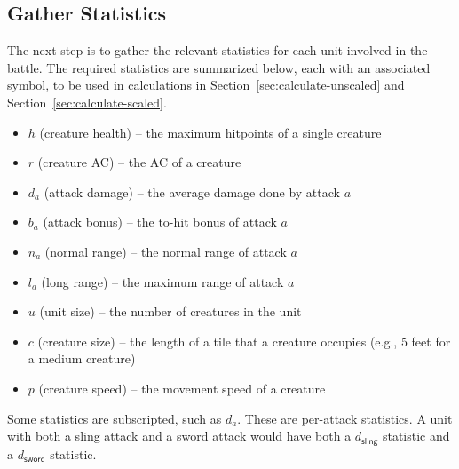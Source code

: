 \subsection{Gather Statistics}

The next step is to gather the relevant statistics
for each unit involved in the battle.
The required statistics are summarized below,
each with an associated symbol,
to be used in calculations in Section~\ref{sec:calculate-unscaled} and Section~\ref{sec:calculate-scaled}.
%
\begin{itemize}
    \item $h$ (creature health) -- the maximum hitpoints of a single creature
    \item $r$ (creature AC) -- the AC of a creature
    \item $d_a$ (attack damage) -- the average damage done by attack $a$
    \item $b_a$ (attack bonus) -- the to-hit bonus of attack $a$
    \item $n_a$ (normal range) -- the normal range of attack $a$
    \item $l_a$ (long range) -- the maximum range of attack $a$
    \item $u$ (unit size) -- the number of creatures in the unit
    \item $c$ (creature size) -- the length of a tile that a creature occupies
        (e.g., 5 feet for a medium creature)
    \item $p$ (creature speed) -- the movement speed of a creature
\end{itemize}
%
Some statistics are subscripted, such as $d_a$.
These are per-attack statistics.
A unit with both a sling attack and a sword attack
would have both a $d_\textsf{sling}$ statistic
and a $d_\textsf{sword}$ statistic.
